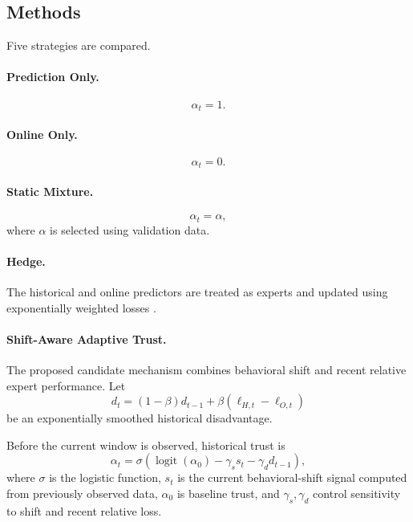 \documentclass[11pt]{article}
\begin{document}
\subsection{Methods}

Five strategies are compared.

\paragraph{Prediction Only.}
%
\begin{equation}
    \alpha_t = 1.
\end{equation}

\paragraph{Online Only.}
%
\begin{equation}
    \alpha_t = 0.
\end{equation}

\paragraph{Static Mixture.}
%
\begin{equation}
    \alpha_t = \alpha,
\end{equation}
%
where $\alpha$ is selected using validation data.

\paragraph{Hedge.}
The historical and online predictors are treated as experts and updated
using exponentially weighted losses
\citep{freund1997decision}.

\paragraph{Shift-Aware Adaptive Trust.}
The proposed candidate mechanism combines behavioral shift and recent
relative expert performance. Let
%
\begin{equation}
    d_t
    =
    (1-\beta)d_{t-1}
    +
    \beta
    \left(
        \ell_{H,t}
        -
        \ell_{O,t}
    \right)
\end{equation}
%
be an exponentially smoothed historical disadvantage.

Before the current window is observed, historical trust is
%
\begin{equation}
    \alpha_t
    =
    \sigma
    \left(
        \operatorname{logit}(\alpha_0)
        -
        \gamma_s s_t
        -
        \gamma_d d_{t-1}
    \right),
\end{equation}
%
where $\sigma$ is the logistic function, $s_t$ is the current
behavioral-shift signal computed from previously observed data,
$\alpha_0$ is baseline trust, and $\gamma_s,\gamma_d$ control
sensitivity to shift and recent relative loss.
\end{document}
